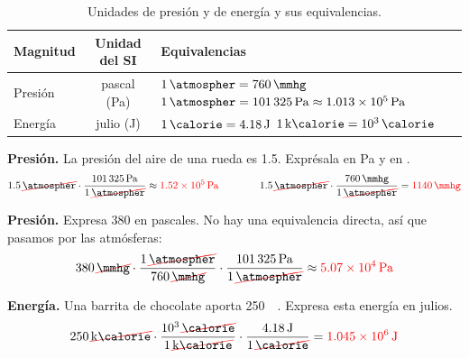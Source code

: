 \begin{table}[H]
    \centering
    \renewcommand{\arraystretch}{1.4}
    \begin{tabular}{lcp{6.5cm}}
        \toprule
        \textbf{Magnitud} & \textbf{Unidad del SI} & \textbf{Equivalencias} \\
        \midrule
        Presión & pascal (\unit{\Pa}) & \(\qty{1}{\atmospher} = \qty{760}{\mmhg}\) \newline \(\qty{1}{\atmospher} = \qty{101325}{\Pa} \approx \qty{1.013e5}{\Pa}\) \\
        Energía & julio (\unit{\J}) & \(\qty{1}{\calorie} = \qty{4.18}{\J}\) \newline \(\qty{1}{\kilo\calorie} = \qty{e3}{\calorie}\) \\
        \bottomrule
    \end{tabular}
    \caption{Unidades de presión y de energía y sus equivalencias.}
    \label{tab:u1_pressure_energy}
\end{table}

\begin{example}
    \textbf{Presión.} La presión del aire de una rueda es \qty{1.5}{\atmospher}. Exprésala en \unit{\Pa} y en \unit{\mmhg}.
    \begin{equation*}
        \num{1.5}\,\cancelunit{\atmospher} \cdot \dfrac{\qty{101325}{\Pa}}{1\,\cancelunit{\atmospher}} \approx \textcolor{red}{\qty{1.52e5}{\Pa}}
        \qquad\qquad
        \num{1.5}\,\cancelunit{\atmospher} \cdot \dfrac{\qty{760}{\mmhg}}{1\,\cancelunit{\atmospher}} = \textcolor{red}{\qty{1140}{\mmhg}}
    \end{equation*}
\end{example}

\begin{example}
    \textbf{Presión.} Expresa \qty{380}{\mmhg} en pascales. No hay una equivalencia directa, así que pasamos por las atmósferas:
    \begin{equation*}
        \num{380}\,\cancelunit{\mmhg} \cdot \dfrac{1\,\cancelunit{\atmospher}}{\num{760}\,\cancelunit{\mmhg}} \cdot \dfrac{\qty{101325}{\Pa}}{1\,\cancelunit{\atmospher}} \approx \textcolor{red}{\qty{5.07e4}{\Pa}}
    \end{equation*}
\end{example}

\begin{example}
    \textbf{Energía.} Una barrita de chocolate aporta \qty{250}{\kilo\calorie}. Expresa esta energía en julios.
    \begin{equation*}
        \num{250}\,\cancelunit{\kilo\calorie} \cdot \dfrac{\num{e3}\,\cancelunit{\calorie}}{1\,\cancelunit{\kilo\calorie}} \cdot \dfrac{\qty{4.18}{\J}}{1\,\cancelunit{\calorie}} = \textcolor{red}{\qty{1.045e6}{\J}}
    \end{equation*}
\end{example}


